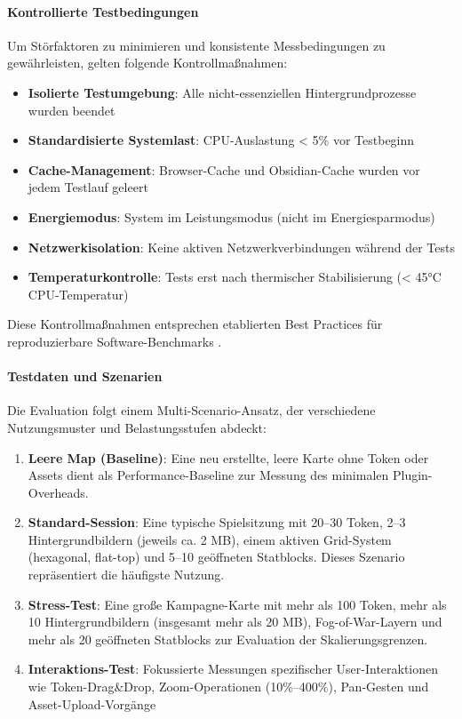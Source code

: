 \paragraph{Kontrollierte Testbedingungen}
Um Störfaktoren zu minimieren und konsistente Messbedingungen zu gewährleisten, gelten folgende Kontrollmaßnahmen:
\begin{itemize}
	\item \textbf{Isolierte Testumgebung}: Alle nicht-essenziellen Hintergrundprozesse wurden beendet
	\item \textbf{Standardisierte Systemlast}: \ac{CPU}-Auslastung < 5\% vor Testbeginn
	\item \textbf{Cache-Management}: Browser-Cache und Obsidian-Cache wurden vor jedem Testlauf geleert
	\item \textbf{Energiemodus}: System im Leistungsmodus (nicht im Energiesparmodus)
	\item \textbf{Netzwerkisolation}: Keine aktiven Netzwerkverbindungen während der Tests
	\item \textbf{Temperaturkontrolle}: Tests erst nach thermischer Stabilisierung (< 45°C \ac{CPU}-Temperatur)
\end{itemize}

Diese Kontrollmaßnahmen entsprechen etablierten Best Practices für reproduzierbare Software-Benchmarks \autocite{SPECCPU2017RunRules}.

\paragraph{Testdaten und Szenarien}
Die Evaluation folgt einem Multi-Scenario-Ansatz, der verschiedene Nutzungsmuster und Belastungsstufen abdeckt:

\begin{enumerate}
	\item \textbf{Leere Map (Baseline)}: Eine neu erstellte, leere Karte ohne Token oder Assets dient als Performance-Baseline zur Messung des minimalen Plugin-Overheads.

	\item \textbf{Standard-Session}: Eine typische Spielsitzung mit 20--30 Token, 2--3 Hintergrundbildern (jeweils ca. 2 \ac{MB}), einem aktiven Grid-System (hexagonal, flat-top) und 5--10 geöffneten Statblocks. Dieses Szenario repräsentiert die häufigste Nutzung.

	\item \textbf{Stress-Test}: Eine große Kampagne-Karte mit mehr als 100 Token, mehr als 10 Hintergrundbildern (insgesamt mehr als 20 \ac{MB}), Fog-of-War-Layern und mehr als 20 geöffneten Statblocks zur Evaluation der Skalierungsgrenzen.

	\item \textbf{Interaktions-Test}: Fokussierte Messungen spezifischer User-Interaktionen wie Token-Drag\&Drop, Zoom-Operationen (10\%--400\%), Pan-Gesten und Asset-Upload-Vorgänge
\end{enumerate}

